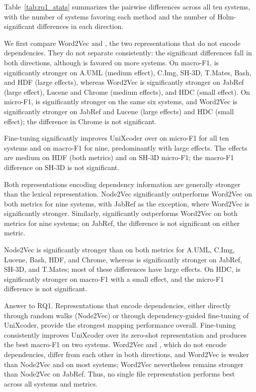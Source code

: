  Table~\ref {tab:rq1_stats} summarizes the pairwise differences across all ten systems, with the number of systems favoring each method and the number of Holm-significant differences in each direction.


We first compare Word2Vec and \zs{}, the two representations that do not encode dependencies. They do not separate consistently: the significant differences fall in both directions, although \zs{} is favored on more systems. On macro-F1, \zs{} is significantly stronger on A.UML (medium effect), C.Img, SH-3D, T.Mates, Bash, and HDF (large effects), whereas Word2Vec is significantly stronger on JabRef (large effect), Lucene and Chrome (medium effects), and HDC (small effect). On micro-F1, \zs{} is significantly stronger on the same six systems, and Word2Vec is significantly stronger on JabRef and Lucene (large effects) and HDC (small effect); the difference in Chrome is not significant.
 
Fine-tuning significantly improves UniXcoder over \zs{} on micro-F1 for all ten systems and on macro-F1 for nine, predominantly with large effects. The effects are medium on HDF (both metrics) and on SH-3D micro-F1; the macro-F1 difference on SH-3D is not significant.

Both representations encoding dependency information are generally stronger than the lexical representation. Node2Vec significantly outperforms Word2Vec on both metrics for nine systems, with JabRef as the exception, where Word2Vec is significantly stronger. Similarly, \ft{} significantly outperforms Word2Vec on both metrics for nine systems; on JabRef, the difference is not significant on either metric.
 
Node2Vec is significantly stronger than \ft{} on both metrics for A.UML, C.Img, Lucene, Bash, HDF, and Chrome, whereas \ft{} is significantly stronger on JabRef, SH-3D, and T.Mates; most of these differences have large effects. On HDC, \ft{} is significantly stronger on macro-F1 with a small effect, and the micro-F1 difference is not significant.

\begin{GrayBox}{Answer to RQ1.}
Representations that encode dependencies, either directly through random walks (Node2Vec) or through dependency-guided fine-tuning of UniXcoder, provide the strongest mapping performance overall. Fine-tuning consistently improves UniXcoder over its zero-shot representation and produces the best macro-F1 on two systems. Word2Vec and \zs{}, which do not encode dependencies, differ from each other in both directions, and Word2Vec is weaker than Node2Vec and \ft{} on most systems; Word2Vec nevertheless remains stronger than Node2Vec on JabRef. Thus, no single file representation performs best across all systems and metrics.
\end{GrayBox}
